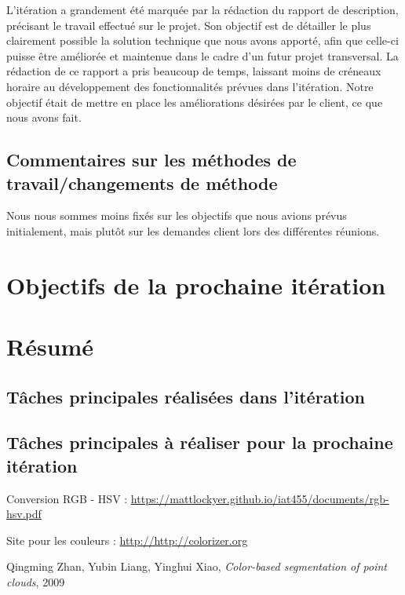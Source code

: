 \documentclass[12pt,titlepage,french]{article}
\begin{document}
L'itération a grandement été marquée par la rédaction du rapport de description, précisant le travail effectué sur le projet. Son objectif est de détailler le plus clairement possible la solution technique que nous avons apporté, afin que celle-ci puisse être améliorée et maintenue dans le cadre d'un futur projet transversal.
La rédaction de ce rapport a pris beaucoup de temps, laissant moins de créneaux horaire au développement des fonctionnalités prévues dans l'itération.
Notre objectif était de mettre en place les améliorations désirées par le client, ce que nous avons fait.

\subsection{Commentaires sur les méthodes de travail/changements de méthode}

Nous nous sommes moins fixés sur les objectifs que nous avions prévus initialement, mais plutôt sur les demandes client lors des différentes réunions.
\section{Objectifs de la prochaine itération}




\section{Résumé}
\subsection{Tâches principales réalisées dans l'itération}

\subsection{Tâches principales à réaliser pour la prochaine itération}

\begin{thebibliography}{3}

 Conversion RGB - HSV : \newline
\url{https://mattlockyer.github.io/iat455/documents/rgb-hsv.pdf}

 Site pour les couleurs : \newline
\url{http://http://colorizer.org}

 Qingming Zhan, Yubin Liang, Yinghui Xiao, \textit{Color-based segmentation of point clouds}, 2009
\end{thebibliography}
\end{document}
